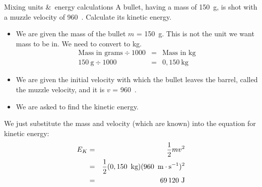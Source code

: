       \noindent
\begin{wex}{Mixing units \&\ energy calculations }{A bullet, having a mass of 150~g, is shot with a muzzle velocity of 960~\ms. Calculate its kinetic energy.}
{
\begin{itemize}
\item We are given the mass of the bullet $m$ = 150~g. This is not the
unit we want mass to be in. We need to convert to kg.
\begin{eqnarray*}
\text{Mass in grams} \div 1000 &=& \text{Mass in kg}\\
150~\text{g} \div 1000 &=& 0,150~\text{kg}
\end{eqnarray*}

\item We are given the initial velocity with which the bullet leaves the barrel, called the muzzle velocity, and it is $v$ = 960~\ms.
\end{itemize}
\begin{itemize}
\item We are asked to find the kinetic energy.
\end{itemize}

We just substitute the mass and velocity (which are known) into the equation for kinetic energy:
\begin{eqnarray*}
E_{K} & = & \frac{1}{2}mv^2 \\
&= & \frac{1}{2}(0,150~\,\text{kg})(960~\,\text{m} \cdot \text{s}^{-1})^2 \\
&=& 69\,120 \text{ J}
\end{eqnarray*}}
\end{wex}
    \noindent

